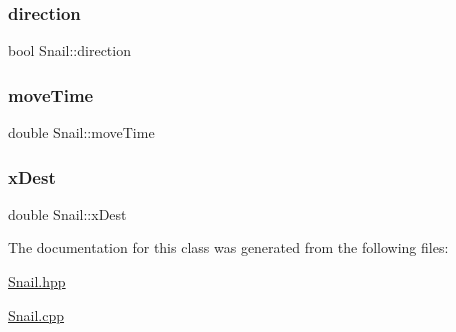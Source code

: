\subsubsection{\texorpdfstring{direction}{direction}}
{\footnotesize\ttfamily bool Snail\+::direction\hspace{0.3cm}{\ttfamily [private]}}

\mbox{\label{class_snail_a16550c11e1c28bdd178cc0300436f054}} 
\subsubsection{\texorpdfstring{move\+Time}{moveTime}}
{\footnotesize\ttfamily double Snail\+::move\+Time\hspace{0.3cm}{\ttfamily [private]}}

\mbox{\label{class_snail_ab24202a09a2bfc54a801d963bab10a34}} 
\subsubsection{\texorpdfstring{x\+Dest}{xDest}}
{\footnotesize\ttfamily double Snail\+::x\+Dest\hspace{0.3cm}{\ttfamily [private]}}



The documentation for this class was generated from the following files\+:\begin{DoxyCompactItemize}
\item 
\mbox{\hyperlink{_snail_8hpp}{Snail.\+hpp}}\item 
\mbox{\hyperlink{_snail_8cpp}{Snail.\+cpp}}\end{DoxyCompactItemize}
